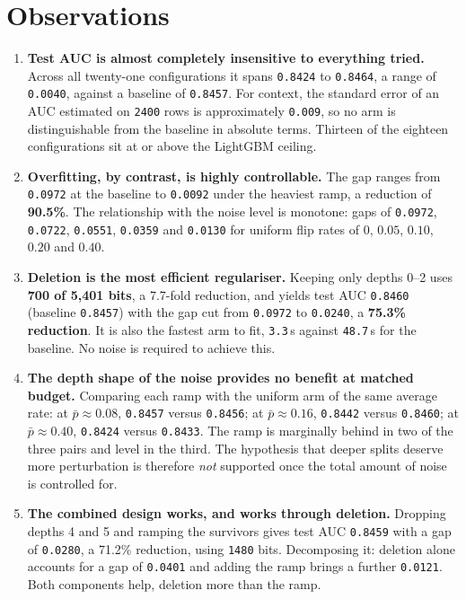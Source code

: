 \documentclass[11pt,a4paper]{article}
\newcommand{\num}[1]{\texttt{#1}}
\begin{document}
\clearpage
\section{Observations}

\begin{enumerate}

\item \textbf{Test AUC is almost completely insensitive to everything tried.}
Across all twenty-one configurations it spans \num{0.8424} to \num{0.8464}, a
range of \num{0.0040}, against a baseline of \num{0.8457}. For context, the
standard error of an AUC estimated on \num{2400} rows is approximately
\num{0.009}, so no arm is distinguishable from the baseline in absolute terms.
Thirteen of the eighteen configurations sit at or above the LightGBM ceiling.

\item \textbf{Overfitting, by contrast, is highly controllable.} The gap ranges
from \num{0.0972} at the baseline to \num{0.0092} under the heaviest ramp, a
reduction of \textbf{90.5\%}. The relationship with the noise level is
monotone: gaps of \num{0.0972}, \num{0.0722}, \num{0.0551}, \num{0.0359} and
\num{0.0130} for uniform flip rates of $0$, $0.05$, $0.10$, $0.20$ and $0.40$.

\item \textbf{Deletion is the most efficient regulariser.} Keeping only depths
0--2 uses \textbf{700 of 5{,}401 bits}, a 7.7-fold reduction, and yields test
AUC \num{0.8460} (baseline \num{0.8457}) with the gap cut from \num{0.0972} to
\num{0.0240}, a \textbf{75.3\% reduction}. It is also the fastest arm to fit,
\num{3.3}\,s against \num{48.7}\,s for the baseline. No noise is required to
achieve this.

\item \textbf{The depth shape of the noise provides no benefit at matched
budget.} Comparing each ramp with the uniform arm of the same average rate:
at $\bar p \approx 0.08$, \num{0.8457} versus \num{0.8456}; at $\bar p \approx
0.16$, \num{0.8442} versus \num{0.8460}; at $\bar p \approx 0.40$, \num{0.8424}
versus \num{0.8433}. The ramp is marginally behind in two of the three pairs and
level in the third. The hypothesis that deeper splits deserve more perturbation
is therefore \emph{not} supported once the total amount of noise is controlled
for.

\item \textbf{The combined design works, and works through deletion.} Dropping
depths 4 and 5 and ramping the survivors gives test AUC \num{0.8459} with a gap
of \num{0.0280}, a 71.2\% reduction, using \num{1480} bits. Decomposing it:
deletion alone accounts for a gap of \num{0.0401} and adding the ramp brings a
further \num{0.0121}. Both components help, deletion more than the ramp.


\end{enumerate}
\end{document}
